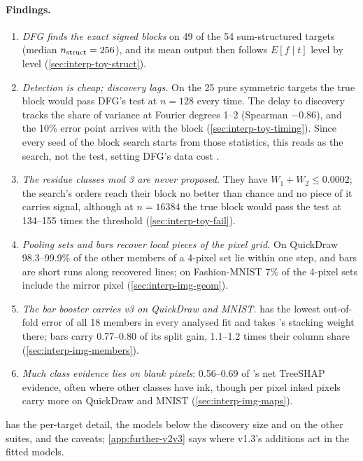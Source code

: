 \paragraph{Findings.}
\begin{enumerate}
\item \emph{DFG finds the exact signed blocks} on 49 of the 54 sum-structured targets (median $n_{\rm struct}=256$), and its mean output then follows $E[f\mid t]$ level by level (\cref{sec:interp-toy-struct}).
\item \emph{Detection is cheap; discovery lags.} On the 25 pure symmetric targets the true block would pass DFG's test at $n=128$ every time. The delay to discovery tracks the share of variance at Fourier degrees 1--2 (Spearman $-0.86$), and the 10\% error point arrives with the block (\cref{sec:interp-toy-timing}). Since every seed of the block search starts from those statistics, this reads as the search, not the test, setting DFG's data cost .
\item \emph{The residue classes mod 3 are never proposed.} They have $W_1+W_2\le0.0002$; the search's orders reach their block no better than chance and no piece of it carries signal, although at $n=16384$ the true block would pass the test at 134--155 times the threshold (\cref{sec:interp-toy-fail}).
\item \emph{Pooling sets and bars recover local pieces of the pixel grid.} On QuickDraw 98.3--99.9\% of the other members of a 4-pixel set lie within one step, and bars are short runs along recovered lines; on Fashion-MNIST 7\% of the 4-pixel sets include the mirror pixel (\cref{sec:interp-img-geom}).
\item \emph{The bar booster carries v3 on QuickDraw and MNIST.}  has the lowest out-of-fold error of all 18 members in every analysed fit and takes 's stacking weight there; bars carry 0.77--0.80 of its split gain, 1.1--1.2 times their column share (\cref{sec:interp-img-members}).
\item \emph{Much class evidence lies on blank pixels}: 0.56--0.69 of 's net TreeSHAP evidence, often where other classes have ink, though per pixel inked pixels carry more on QuickDraw and MNIST (\cref{sec:interp-img-maps}).
\end{enumerate}
 has the per-target detail, the models below the discovery size and on the other suites, and the caveats; \cref{app:further-v2v3} says where v1.3's additions act in the fitted models.

